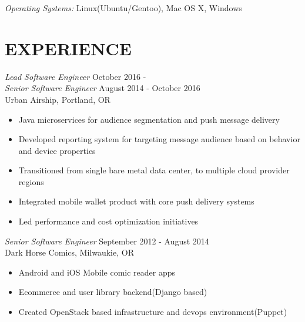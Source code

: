 \documentclass[margin]{res}
\begin{document}
\begin{resume}
		{\sl Operating Systems:} Linux(Ubuntu/Gentoo), Mac OS X, Windows

\section{EXPERIENCE} {\sl Lead Software Engineer} \hfill October 2016 -  \\
		{\sl Senior Software Engineer} \hfill August 2014 - October 2016 \\
                Urban Airship, Portland, OR
                 \begin{itemize}  \itemsep -2pt %
                     \item Java microservices for audience segmentation and push message delivery
                     \item Developed reporting system for targeting message audience based on behavior and device properties
                     \item Transitioned from single bare metal data center, to multiple cloud provider regions
                     \item Integrated mobile wallet product with core push delivery systems
                     \item Led performance and cost optimization initiatives
                 \end{itemize}

                {\sl Senior Software Engineer} \hfill September 2012 - August 2014 \\
                Dark Horse Comics, Milwaukie, OR
                 \begin{itemize}  \itemsep -2pt %
                 	\item Android and iOS Mobile comic reader apps
               		\item Ecommerce and user library backend(Django based)
              		\item Created OpenStack based infrastructure and devops environment(Puppet)
                \end{itemize}


\end{resume}
\end{document}
